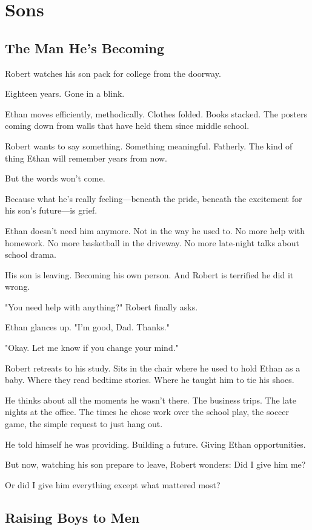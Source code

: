 \documentclass[11pt,twoside]{book}
\begin{document}
\chapter{Sons}

\section*{The Man He's Becoming}

Robert watches his son pack for college from the doorway.

Eighteen years. Gone in a blink.

Ethan moves efficiently, methodically. Clothes folded. Books stacked. The posters coming down from walls that have held them since middle school.

Robert wants to say something. Something meaningful. Fatherly. The kind of thing Ethan will remember years from now.

But the words won't come.

Because what he's really feeling—beneath the pride, beneath the excitement for his son's future—is grief.

Ethan doesn't need him anymore. Not in the way he used to. No more help with homework. No more basketball in the driveway. No more late-night talks about school drama.

His son is leaving. Becoming his own person. And Robert is terrified he did it wrong.

"You need help with anything?" Robert finally asks.

Ethan glances up. "I'm good, Dad. Thanks."

"Okay. Let me know if you change your mind."

Robert retreats to his study. Sits in the chair where he used to hold Ethan as a baby. Where they read bedtime stories. Where he taught him to tie his shoes.

He thinks about all the moments he wasn't there. The business trips. The late nights at the office. The times he chose work over the school play, the soccer game, the simple request to just hang out.

He told himself he was providing. Building a future. Giving Ethan opportunities.

But now, watching his son prepare to leave, Robert wonders: Did I give him me?

Or did I give him everything except what mattered most?

\section*{Raising Boys to Men}
\end{document}
